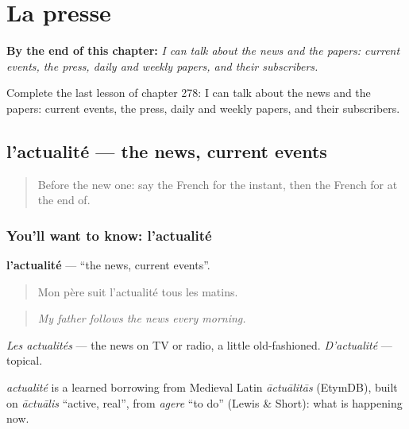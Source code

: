 
\chapter{La presse}
\label{ch:fr-la-presse}

\begin{chapteropening}
\textbf{By the end of this chapter:} \emph{I can talk about the news and the papers: current events, the press, daily and weekly papers, and their subscribers.}

Complete the last lesson of chapter 278: I can talk about the news and the papers: current events, the press, daily and weekly papers, and their subscribers.
\end{chapteropening}

\section[l'actualité]{l'actualité — the news, current events}

\label{lesson:FR-C278-actualite}



\begin{quote}
Before the new one: say the French for the instant, then the French for at the end of.
\end{quote}

\subsection*{You'll want to know: l'actualité}
\textbf{l'actualité} — \textquotedblleft{}the news, current events\textquotedblright{}.

\begin{quote}
Mon père suit l'actualité tous les matins.
\end{quote}

\begin{quote}
\emph{My father follows the news every morning.}
\end{quote}

\emph{Les actualités} — the news on TV or radio, a little old-fashioned. \emph{D'actualité} — topical.

\begin{cousinweb}
\emph{actualité} is a learned borrowing from Medieval Latin \emph{āctuālitās} (EtymDB), built on \emph{āctuālis} \textquotedblleft{}active, real\textquotedblright{}, from \emph{agere} \textquotedblleft{}to do\textquotedblright{} (Lewis \& Short): what is happening now.
\end{cousinweb}

